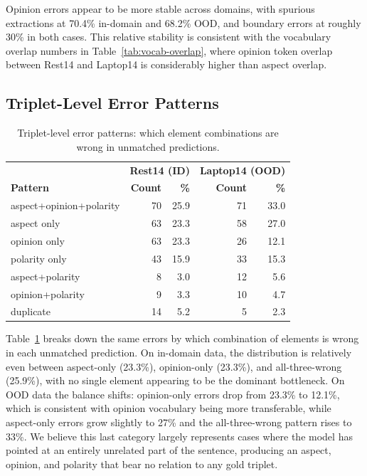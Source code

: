 \documentclass[12pt,a4paper]{report}
\begin{document}
Opinion errors appear to be more stable across domains, with spurious extractions at 70.4\% in-domain and 68.2\% OOD, and boundary errors at roughly 30\% in both cases. This relative stability is consistent with the vocabulary overlap numbers in Table~\ref{tab:vocab-overlap}, where opinion token overlap between Rest14 and Laptop14 is considerably higher than aspect overlap.

\subsection{Triplet-Level Error Patterns}

\begin{table}[H]
\centering
\caption{Triplet-level error patterns: which element combinations are wrong in unmatched predictions.}
\label{tab:errors-triplet}
\small
\begin{tabular}{@{}lrrrr@{}}
\toprule
& \multicolumn{2}{c}{\textbf{Rest14 (ID)}} & \multicolumn{2}{c}{\textbf{Laptop14 (OOD)}} \\
\textbf{Pattern} & \textbf{Count} & \textbf{\%} & \textbf{Count} & \textbf{\%} \\
\midrule
aspect+opinion+polarity & 70 & 25.9 & 71 & 33.0 \\
aspect only & 63 & 23.3 & 58 & 27.0 \\
opinion only & 63 & 23.3 & 26 & 12.1 \\
polarity only & 43 & 15.9 & 33 & 15.3 \\
aspect+polarity & 8 & 3.0 & 12 & 5.6 \\
opinion+polarity & 9 & 3.3 & 10 & 4.7 \\
duplicate & 14 & 5.2 & 5 & 2.3 \\
\bottomrule
\end{tabular}
\end{table}

Table~\ref{tab:errors-triplet} breaks down the same errors by which combination of elements is wrong in each unmatched prediction. On in-domain data, the distribution is relatively even between aspect-only (23.3\%), opinion-only (23.3\%), and all-three-wrong (25.9\%), with no single element appearing to be the dominant bottleneck. On OOD data the balance shifts: opinion-only errors drop from 23.3\% to 12.1\%, which is consistent with opinion vocabulary being more transferable, while aspect-only errors grow slightly to 27\% and the all-three-wrong pattern rises to 33\%. We believe this last category largely represents cases where the model has pointed at an entirely unrelated part of the sentence, producing an aspect, opinion, and polarity that bear no relation to any gold triplet.
\end{document}
